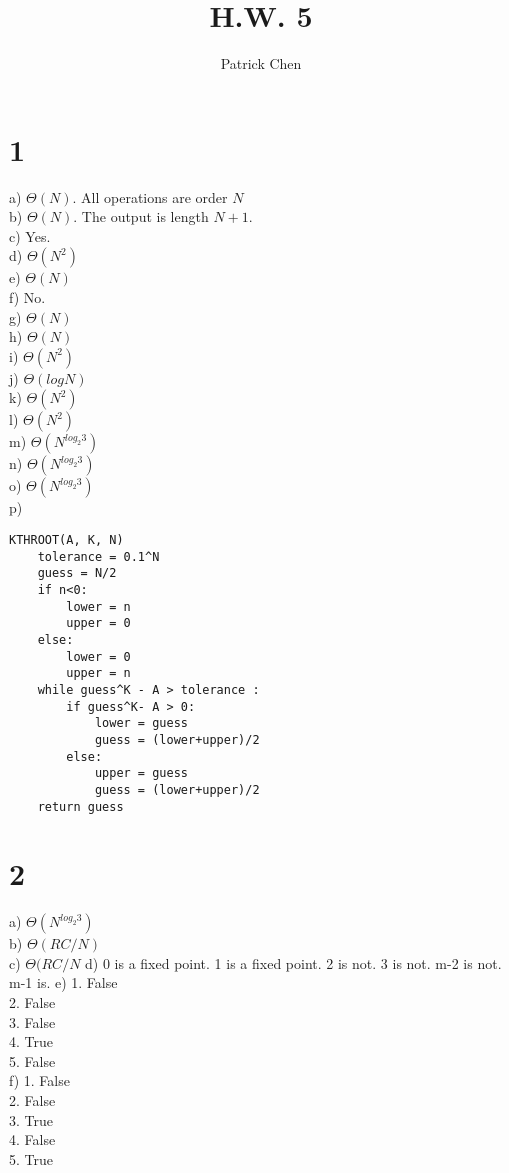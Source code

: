 \documentclass[10pt,a4paper]{article}
\title{H.W. 5}
\author{Patrick Chen}
\begin{document}
\maketitle
\tableofcontents
\section*{1}
a) $\Theta(N)$. All operations are order $N$\\
b) $\Theta(N)$. The output is length $N+1$. \\
c) Yes. \\
d) $\Theta(N^2)$\\
e) $\Theta(N)$\\
f) No. \\
g) $\Theta(N)$ \\
h) $\Theta(N)$ \\ 
i) $\Theta(N^2)$ \\
j) $\Theta(log N)$ \\
k) $\Theta(N^2)$ \\
l) $\Theta(N^2)$ \\
m) $\Theta(N^{log_2 3})$ \\
n) $\Theta(N^{log_2 3})$ \\
o) $\Theta(N^{log_2 3})$ \\
p) \\
\begin{lstlisting}
KTHROOT(A, K, N)
	tolerance = 0.1^N
	guess = N/2
	if n<0: 
		lower = n
		upper = 0 
	else:
		lower = 0
		upper = n
	while guess^K - A > tolerance :
		if guess^K- A > 0:
			lower = guess
			guess = (lower+upper)/2
		else: 
			upper = guess
			guess = (lower+upper)/2
	return guess
\end{lstlisting}
\section*{2}
a) $\Theta(N^{log_2 3})$ \\
b) $\Theta(RC/N)$ \\
c) $\Theta(RC/N $
d) 0 is a fixed point. 1 is a fixed point. 2 is not. 3 is not. m-2 is not. m-1 is.
e) 1. False \\
2. False \\
3. False \\
4. True \\
5. False \\
f) 
1. False \\
2. False \\
3. True \\
4. False \\
5. True \\
		
\end{document}
